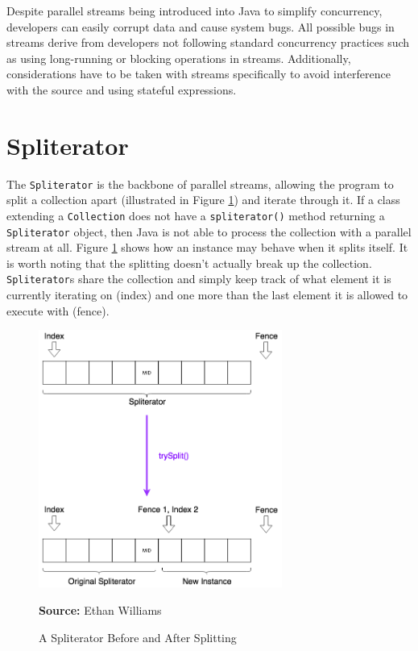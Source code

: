 \documentclass[oneside, 12pt]{article}
\newcommand{\source}[1]{\textbf{Source:} {#1} }
\begin{document}
Despite parallel streams being introduced into Java to simplify concurrency, developers can easily corrupt data and cause system bugs. All possible bugs in streams derive from developers not following standard concurrency practices such as using long-running or blocking operations in streams. Additionally, considerations have to be taken with streams specifically to avoid interference with the source and using stateful expressions.

\section{Spliterator}
The \verb|Spliterator| is the backbone of parallel streams, allowing the program to split a collection apart (illustrated in Figure \ref{fig:split}) and iterate through it. If a class extending a \verb|Collection| does not have a \verb|spliterator()| method returning a \verb|Spliterator| object, then Java is not able to process the collection with a parallel stream at all. Figure \ref{fig:split} shows how an instance may behave when it splits itself. It is worth noting that the splitting doesn't actually break up the collection. \verb|Spliterator|s share the collection and simply keep track of what element it is currently iterating on (index) and one more than the last element it is allowed to execute with (fence).

\begin{figure}[H]
\centering
\includegraphics[width=8cm]{../images/spliterator.png}
\caption{A Spliterator Before and After Splitting}
\source{Ethan Williams}
\label{fig:split}
\end{figure}
\end{document}

